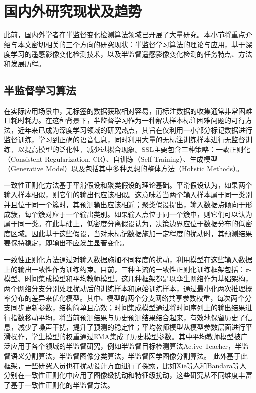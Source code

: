 \documentclass[lang=chs, degree=master, blindreview=false, adobe=false]{yanputhesis}
\begin{document}
\section{国内外研究现状及趋势}
此前，国内外学者在半监督变化检测算法领域已开展了大量研究。本小节将重点介绍与本文密切相关的三个方向的研究现状：半监督学习算法的理论与应用，基于深度学习的遥感影像变化检测技术，以及半监督遥感影像变化检测的任务特点、方法和发展历程。
\subsection{半监督学习算法}
在实际应用场景中，无标签的数据获取相对容易，而标注数据的收集通常非常困难且耗时耗力。在这种背景下，半监督学习作为一种解决样本标注困难问题的可行方法，近年来已成为深度学习领域的研究热点，其旨在仅利用一小部分标记数据进行监督训练，学习到正确的语音信息，同时利用大量的无标注训练样本进行无监督训练，以提高模型的泛化性，减少过拟合现象。SSL主要包含三种策略：一致正则化（Consistent Regularization, CR）、自训练（Self Training）、生成模型（Generative Model）以及包括其中多种思想的整体方法（Holistic Methods）。

一致性正则化方法基于平滑假设\cite{van2020smmooth}和聚类假设\cite{lee2013pseudo}的理论基础。平滑假设认为，如果两个输入样本相似，则它们的输出也应该相似。这意味着当两个输入样本属于同一类别并且位于同一个簇时，其预测输出应该相近；聚类假设提出，输入数据点倾向于形成簇，每个簇对应于一个输出类别。如果输入点位于同一个簇中，则它们可以认为属于同一类。在此基础上，低密度分离假设认为，决策边界应位于数据分布的低密度区域。因此基于这些假设，当对未标记数据施加一定程度的扰动时，其预测结果要保持稳定，即输出不应发生显著变化。

一致性正则化方法通过对输入数据施加不同程度的扰动，利用模型在这些输入数据上的输出一致性作为训练约束。目前，三种主流的一致性正则化训练框架包括：$\pi$-模型\cite{laine2016temporal}、时间集成模型\cite{laine2016temporal}和平均教师模型\cite{Tarvainen2017teacher}。这几种框架都是以孪生网络作为基础架构，两个网络分支分别处理扰动后的训练样本和原始训练样本，通过最小化两次推理概率分布的差异来优化模型。其中$\pi$-模型的两个分支网络共享参数权重，每次两个分支同步更新参数，结构简单且高效；时间集成模型通过将时间序列上的输出结果进行指数移动平均，将当前预测结果与历史预测结果结合起来，有效地保留历史了信息，减少了噪声干扰，提升了预测的稳定性；平均教师模型从模型参数层面进行平滑操作，学生模型的权重通过EMA集成了历史模型参数。其中平均教师模型被广泛应用于各个领域的半监督研究，例如半监督目标检测算法Active-Teacher\cite{ActiveTeacher}，半监督语义分割算法\cite{mittal2019s4GAN}\cite{UniMatch}\cite{AugSeg}\cite{iMAS}，半监督图像分类算法\cite{sohn2020fixmatch}，半监督医学图像分割算法\cite{transformation_medical}\cite{zhangSemiSAMExploringSAM2023}。
此外基于此框架，一些研究人员也在扰动设计方面进行了探索，比如Xie等人\cite{xie2020unsupervised}和Bandara等人\cite{bandara2022RCR}分别在一致性正则化中应用了图像级扰动和特征级扰动，这些研究从不同维度丰富了基于一致性正则化的半监督方法。
\end{document}
